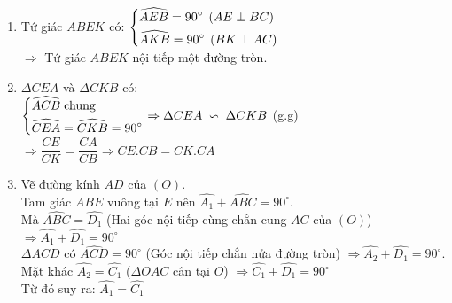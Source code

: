 \begin{bt}
{\begin{center}
\end{center}
    \begin{enumerate}
        \item Tứ giác $ABEK$ có: $\left\{\begin{aligned}&\widehat{AEB}=90^\circ\;\left(AE\perp BC\right)\\
        &\widehat{AKB}=90^\circ\;\left(BK\perp AC\right)\end{aligned}\right.$ \\
        $\Rightarrow $ Tứ giác $ABEK$ nội tiếp một đường tròn.
        \item $\Delta CEA$ và $\Delta CKB$ có:\\
        $\left\{\begin{aligned}&\widehat{ACB}\; \text{chung}\\&\widehat{CEA}=\widehat{CKB}=90^\circ\end{aligned}\right.\Rightarrow \Delta CEA\;\backsim\;\Delta CKB$ (g.g)\\ $\Rightarrow \dfrac{CE}{CK}=\dfrac{CA}{CB}\Rightarrow CE.CB=CK.CA$
        \item Vẽ đường kính $AD$ của $(O)$.\\
        Tam giác $ABE$ vuông tại $E$ nên $\widehat{A_1}+\widehat{ABC}=90^\circ$.\\
        Mà $\widehat{ABC}=\widehat{D_1}$ (Hai góc nội tiếp cùng chắn cung $AC$ của $(O)$)
        $\Rightarrow \widehat{A_1}+\widehat{D_1}=90^\circ$\\
        $\Delta ACD$ có $\widehat{ACD}=90^\circ$ (Góc nội tiếp chắn nửa đường tròn) $\Rightarrow \widehat{A_2}+\widehat{D_1}=90^\circ$.\\
        Mặt khác $\widehat{A_2}=\widehat{C_1}$ ($\Delta OAC$ cân tại $O$) $\Rightarrow \widehat{C_1}+\widehat{D_1}=90^\circ$\\
        Từ đó suy ra: $\widehat{A_1}=\widehat{C_1}$

\end{enumerate}}
\end{bt}
